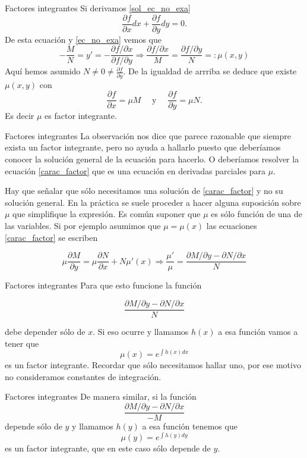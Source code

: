 \documentclass[handout,hyperref={colorlinks=true}]{beamer}
\renewcommand{\emph}[1]{\textcolor[rgb]{1,0,0}{#1}}
\newcommand{\der}[2]{\frac{\partial #1}{\partial #2}}
\begin{document}
\begin{frame}{Factores integrantes}
Si derivamos \eqref{sol_ec_no_exa}
\[\der{f}{x}dx+\der{f}{y}dy=0.\]
De esta ecuación y \eqref{ec_no_exa} vemos que
\[-\frac{M}{N}=y'=-\frac{\partial f /\partial x}{\partial f/\partial y}\Longrightarrow \frac{ \partial f /\partial x}{M}=\frac{ \partial f/\partial y}{N}=:\mu(x,y)\]
Aquí hemos asumido $N\neq 0 \neq\der{f}{y}$. De la igualdad de arrriba se deduce que existe $\mu(x,y)$ con
\[\der{f}{x}=\mu M\quad\text{ y }\quad \der{f}{y}=\mu N.\]
Es decir $\mu$ es factor integrante.
\end{frame}

\begin{frame}{Factores integrantes}
La observación nos dice que parece razonable que siempre exista un factor integrante, pero no ayuda a hallarlo puesto que deberíamos conocer la solución general de la ecuación
para hacerlo. O deberíamos resolver la ecuación \eqref{carac_factor} que es una ecuación en derivadas parciales para $\mu$.

Hay que señalar que sólo necesitamos una solución de \eqref{carac_factor} y no su solución general. En la práctica se suele proceder a hacer alguna suposición
sobre $\mu$ que simplifique la expresión. Es común suponer que $\mu$ es sólo función de una de las variables. Si por ejemplo asumimos que $\mu=\mu(x)$ las ecuaciones 
\eqref{carac_factor} se escriben

\[\mu\der{M}{y}=\mu\der{N}{x}+N\mu'(x) \Longrightarrow\boxed{\frac{\mu'}{\mu}=\frac{\partial M/\partial y-\partial N/\partial x}{N}}\]
\end{frame}


\begin{frame}{Factores integrantes}
Para que esto funcione la función 

\[\frac{\partial M/\partial y-\partial N/\partial x}{N}\]

\emph{debe depender sólo de $x$}. Si eso ocurre y llamamos $h(x)$ a esa función vamos a tener que
\[\mu(x)=e^{\int h(x)dx}\]
es un factor integrante. Recordar que sólo necesitamos hallar uno, por ese motivo no consideramos constantes de integración. 
\end{frame}

\begin{frame}{Factores integrantes}
De manera similar, si la función
\[\frac{\partial M/\partial y-\partial N/\partial x}{-M}\]
depende sólo de $y$ y llamamos $h(y)$ a esa función tenemos que
\[\mu(y)=e^{\int h(y)dy}\]
es un factor integrante, que en este caso sólo depende de $y$.
\end{frame}
\end{document}
